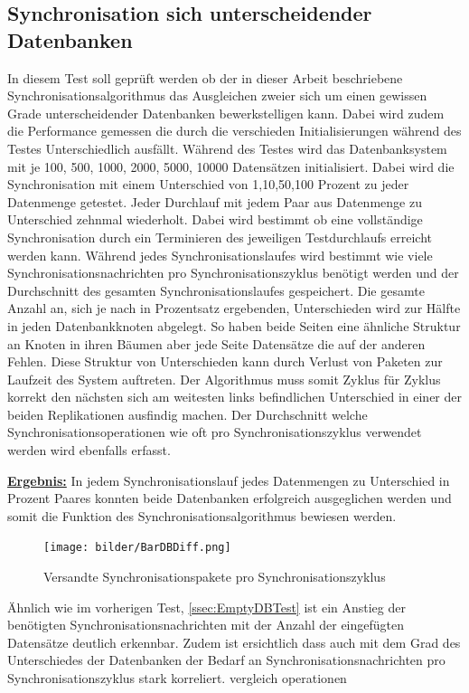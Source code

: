 \documentclass[a4paper,11pt,oneside,%
headsepline,												%
footsepline,												%
bibtotocnumbered									%
]{scrreprt}
\begin{document}
\subsection{Synchronisation sich unterscheidender Datenbanken}
\label{ssec:DiffThroughLost}
In diesem Test soll geprüft werden ob der in dieser Arbeit beschriebene Synchronisationsalgorithmus das Ausgleichen zweier sich um einen gewissen Grade unterscheidender Datenbanken bewerkstelligen kann. Dabei wird zudem die Performance gemessen die durch die verschieden Initialisierungen während des Testes Unterschiedlich ausfällt. Während des Testes wird das Datenbanksystem mit je 100, 500, 1000, 2000, 5000, 10000 Datensätzen initialisiert. Dabei wird die Synchronisation mit einem Unterschied von 1,10,50,100 Prozent zu jeder Datenmenge getestet. Jeder Durchlauf mit jedem Paar aus Datenmenge zu Unterschied zehnmal wiederholt. Dabei wird bestimmt ob eine vollständige Synchronisation durch ein Terminieren des jeweiligen Testdurchlaufs erreicht werden kann. Während jedes Synchronisationslaufes wird bestimmt wie viele Synchronisationsnachrichten pro Synchronisationszyklus benötigt werden und der Durchschnitt des gesamten Synchronisationslaufes gespeichert. Die gesamte Anzahl an, sich je nach in Prozentsatz ergebenden, Unterschieden wird zur Hälfte in jeden Datenbankknoten abgelegt. So haben beide Seiten eine ähnliche Struktur an Knoten in ihren Bäumen aber jede Seite Datensätze die auf der anderen Fehlen. Diese Struktur von Unterschieden kann durch Verlust von Paketen zur Laufzeit des System auftreten. Der Algorithmus muss somit Zyklus für Zyklus korrekt den nächsten sich am weitesten links befindlichen Unterschied in einer der beiden Replikationen ausfindig machen. Der Durchschnitt welche Synchronisationsoperationen wie oft pro Synchronisationszyklus verwendet werden wird ebenfalls erfasst.

\underline{{\bf Ergebnis:}} In jedem Synchronisationslauf jedes Datenmengen zu Unterschied in Prozent Paares konnten beide Datenbanken erfolgreich ausgeglichen werden und somit die Funktion des Synchronisationsalgorithmus bewiesen werden.
\begin{figure}
  \begin{center}
    \texttt{[image: bilder/BarDBDiff.png]}
  \end{center}
 \caption{Versandte Synchronisationspakete pro Synchronisationszyklus}
  \label{fig:EmptyDBTraffic}
\end{figure}
 Ähnlich wie im vorherigen Test, \autoref{ssec:EmptyDBTest} ist ein Anstieg der benötigten Synchronisationsnachrichten mit der Anzahl der eingefügten Datensätze deutlich erkennbar. Zudem ist ersichtlich dass auch mit dem Grad des Unterschiedes der Datenbanken der Bedarf an Synchronisationsnachrichten pro Synchronisationszyklus stark korreliert. %
 vergleich operationen
\end{document}
